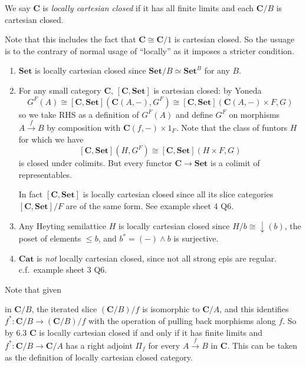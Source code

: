\documentclass[a4paper]{article}
\renewcommand{\c}[1]{\mathbf{#1}}
\newcommand{\Set}{{\c{Set}}}
\begin{document}
\begin{definition}
  We say \(\c C\) is \emph{locally cartesian closed} if it has all finite limits and each \(\c C/B\) is cartesian closed.
\end{definition}

Note that this includes the fact that \(\c C \cong \c C/1\) is cartesian closed. So the usuage is to the contrary of normal usage of ``locally'' as it imposes a stricter condition.

\begin{eg}\leavevmode
  \begin{enumerate}
  \item \(\Set\) is locally cartesian closed since \(\Set/B \simeq \Set^B\) for any \(B\).
  \item For any small category \(\c C\), \([\c C, \Set]\) is cartesian closed: by Yoneda
    \[
      G^F(A) \cong [\c C, \Set](\c C(A, -), G^F) \cong [\c C, \Set](\c C(A, -) \times F, G)
    \]
    so we take RHS as a definition of \(G^F(A)\) and define \(G^F\) on morphisms \(A \xrightarrow{f} B\) by composition with \(\c C(f, -) \times 1_F\). Note that the class of funtors \(H\) for which we have
    \[
      [\c C, \Set](H, G^F) \cong [\c C, \Set](H \times F, G)
    \]
    is closed under colimits. But every functor \(\c C \to \Set\) is a colimit of representables.

    In fact \([\c C, \Set]\) is locally cartesian closed since all its slice categories \([\c C, \Set]/F\) are of the same form. See example sheet 4 Q6.
  \item Any Heyting semilattice \(H\) is locally cartesian closed since \(H/b \cong \downarrow(b)\), the poset of elements \(\leq b\), and \(b^* = (-) \wedge b\) is surjective.
  \item \(\c{Cat}\) is \emph{not} locally cartesian closed, since not all strong epis are regular. c.f.\ example sheet 3 Q6.
  \end{enumerate}
\end{eg}

Note that given
in \(\c C/B\), the iterated slice \((\c C/B)/f\) is isomorphic to \(\c C/A\), and this identifies \(f^*: \c C/B \to (\c C/B)/f\) with the operation of pulling back morphisms along \(f\). So by 6.3 \(\c C\) is locally cartesian closed if and only if it has finite limits and \(f^*: \c C/B \to \c C/A\) has a right adjoint \(\Pi_f\) for every \(A \xrightarrow{f} B\) in \(\c C\). This can be taken as the definition of locally cartesian closed category.
\end{document}
